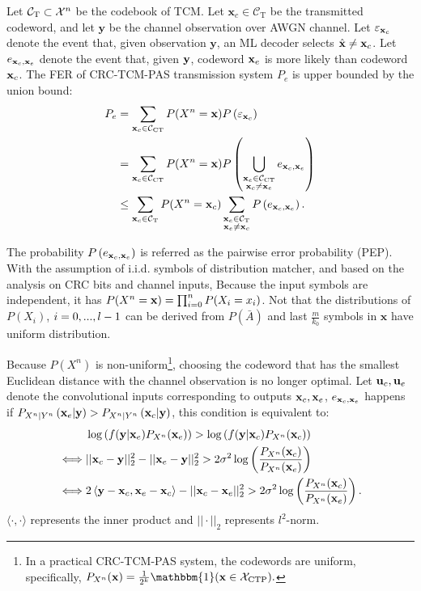 \documentclass [PhD] {uclathes}
\begin{document}
Let $\mathcal{C}_{\mathrm{T}}\subset\mathcal{X}^{n}$ be the codebook of TCM. 
Let $\mathbf{x}_c\in\mathcal{C}_{\mathrm{T}}$ be the transmitted codeword, and let $\mathbf{y}$ be the channel observation over AWGN channel. Let $\varepsilon_{\mathbf{x}_c}$ denote the event that, given observation $\mathbf{y}$, an ML decoder selects  $\hat{\mathbf{x}} \neq \mathbf{x}_{c}$. Let $e_{\mathbf{x}_c,\mathbf{x}_e}$ denote the event that, given $\mathbf{y}$,  codeword $\mathbf{x}_{e}$ is more likely than codeword $\mathbf{x}_{c}$. The FER of CRC-TCM-PAS transmission system $P_e$  is upper bounded by the union bound:
\begin{align}
    P_e&=\sum_{\mathbf{x}_c\in\mathcal{C}_{\mathrm{CT}}}P(X^n=\mathbf{x})P\left(\varepsilon_{\mathbf{x}_c}\right)\\
    &=\sum_{\mathbf{x}_c\in\mathcal{C}_{\mathrm{CT}}}P(X^n=\mathbf{x})P\left(\bigcup_{\substack{\mathbf{x}_e\in\mathcal{C}_{\mathrm{CT}}\\\mathbf{x}_c\neq\mathbf{x}_e}}e_{\mathbf{x}_c,\mathbf{x}_e}\right)\\
    &\leq \sum_{\mathbf{x}_c\in\mathcal{C}_{\mathrm{T}}}P(X^n=\mathbf{x}_c)\sum_{\substack{\mathbf{x}_e\in\mathcal{C}_{\mathrm{T}}\\\mathbf{x}_e\neq\mathbf{x}_c}}P\left(e_{\mathbf{x}_c,\mathbf{x}_e}\right)\label{equ:PEPbound}.
\end{align}

The probability $P\left(e_{\mathbf{x}_c,\mathbf{x}_e}\right)$ is referred as the pairwise error probability (PEP). 
With the assumption of i.i.d. symbols of distribution matcher, and based on the analysis on CRC bits and channel inputs, 
Because the input symbols are independent, it has $P(X^n=\mathbf{x})=\prod_{i=0}^{n}P(X_i=x_i)$. 
Not that the distributions of $P(X_i)$, $i=0,...,l-1$ can be derived from $P(\bar{A})$ and last $\frac{m}{k_0}$ symbols in $\mathbf{x}$ have uniform distribution.

Because $P(X^n)$ is non-uniform\footnote{In a practical CRC-TCM-PAS system, the codewords are uniform, specifically, $P_{X^n}(\mathbf{x})=\frac{1}{2^k}\mathbbm{1}(\mathbf{x}\in\mathcal{X}_{\mathrm{CTP}}).$ }, choosing the codeword that has the smallest Euclidean distance with the channel observation is no longer optimal. Let $\mathbf{u}_{c},\mathbf{u}_{e}$ denote the convolutional inputs corresponding to outputs $\mathbf{x}_{c}, \mathbf{x}_{e}$, $e_{\mathbf{x}_c,\mathbf{x}_e}$ happens if $P_{X^n|Y^n}\left(\mathbf{x}_{e} | \mathbf{y}\right) > P_{X^n|Y^n}\left(\mathbf{x}_{c} | \mathbf{y}\right)$, this condition is equivalent to:
\begin{align}
    &\log\left(f(\mathbf{y} | \mathbf{x}_{e} ) P_{X^n}(\mathbf{x}_{e}) \right) > \log\left(f(\mathbf{y} | \mathbf{x}_{c})P_{X^n}(\mathbf{x}_{c}) \right)\label{equ: log_ineq}\\
    \iff& ||\mathbf{x}_{c}-\mathbf{y}||_2^2 - ||\mathbf{x}_{e}-\mathbf{y}||_2^2 > 2\sigma^2 \log\left(\frac{P_{X^n}(\mathbf{x}_{c})}{P_{X^n}(\mathbf{x}_{e})}\right)\\
    \iff&2\left\langle \mathbf{y} - \mathbf{x}_{c}, \mathbf{x}_{e} - \mathbf{x}_{c} \right\rangle- ||\mathbf{x}_{c}-\mathbf{x}_{e}||_2^2 > 2\sigma^2 \log\left(\frac{P_{X^n}(\mathbf{x}_{c})}{P_{X^n}(\mathbf{x}_{e})}\right).\label{equ:PEPcond0}
\end{align}
$\langle\cdot,\cdot\rangle$ represents the inner product and $||\cdot||_2$ represents $l^2$-norm.  
\end{document}
